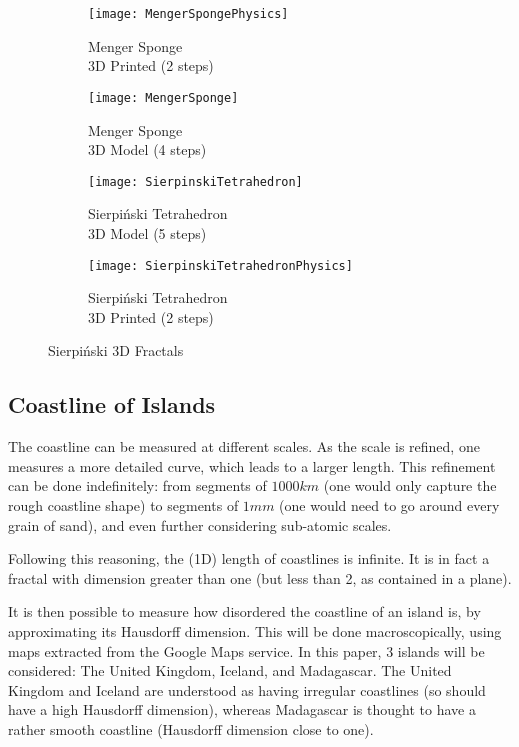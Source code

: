 \begin{figure}[!h]
	\centering
	\begin{subfigure}{.24\textwidth}
		\texttt{[image: MengerSpongePhysics]}
		\centering
		\captionsetup{justification=centering}
		\caption{Menger Sponge\\ 3D Printed (2 steps)}
		\label{fig:MengerSponge3Dprinted}
	\end{subfigure}
	\begin{subfigure}{.24\textwidth}
		\texttt{[image: MengerSponge]}
		\centering
		\captionsetup{justification=centering}
		\caption{Menger Sponge\\ 3D Model (4 steps)}
		\label{fig:MengerSponge}
	\end{subfigure}
	\begin{subfigure}{.24\textwidth}
		\texttt{[image: SierpinskiTetrahedron]}
		\centering
		\captionsetup{justification=centering}
		\caption{Sierpiński Tetrahedron\\ 3D Model (5 steps)}
		\label{fig:SierpinskiTetrahedron}
	\end{subfigure}
	\begin{subfigure}{.24\textwidth}
		\texttt{[image: SierpinskiTetrahedronPhysics]}
		\centering
		\captionsetup{justification=centering}
		\caption{Sierpiński Tetrahedron\\ 3D Printed (2 steps)}
		\label{fig:SierpinskiTetrahedron3Dprinted}
	\end{subfigure}
	\caption{Sierpiński 3D Fractals}
	\label{fig:Sierpinski3D}
\end{figure}

\subsection{Coastline of Islands}\label{appendix:coastlines}
The coastline can be measured at different scales.
As the scale is refined, one measures a more detailed curve, which leads to a larger length.
This refinement can be done indefinitely: from segments of $1000km$ (one would only capture the rough coastline shape) to segments of $1mm$ (one would need to go around every grain of sand), and even further considering sub-atomic scales.

Following this reasoning, the (1D) length of coastlines is infinite.
It is in fact a fractal with dimension greater than one (but less than 2, as contained in a plane).

It is then possible to measure how disordered the coastline of an island is, by approximating its Hausdorff dimension.
This will be done macroscopically, using maps extracted from the Google Maps service.
In this paper, 3 islands will be considered: The United Kingdom, Iceland, and Madagascar.
The United Kingdom and Iceland are understood as having irregular coastlines (so should have a high Hausdorff dimension), whereas Madagascar is thought to have a rather smooth coastline (Hausdorff dimension close to one).

